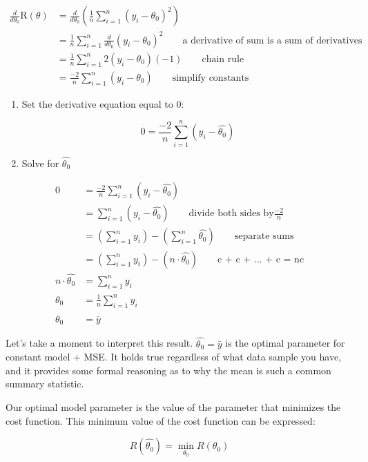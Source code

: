 \documentclass[
  letterpaper,
  DIV=11,
  numbers=noendperiod]{scrreprt}
\begin{document}
\[
\begin{align}
\frac{d}{d\theta_0}\text{R}(\theta) & = \frac{d}{d\theta_0}(\frac{1}{n}\sum^{n}_{i=1} (y_i - \theta_0)^2)
\\ &= \frac{1}{n}\sum^{n}_{i=1} \frac{d}{d\theta_0}  (y_i - \theta_0)^2 \quad \quad \text{a derivative of sum is a sum of derivatives}
\\ &= \frac{1}{n}\sum^{n}_{i=1} 2 (y_i - \theta_0) (-1) \quad \quad \text{chain rule}
\\ &= {\frac{-2}{n}}\sum^{n}_{i=1} (y_i - \theta_0) \quad \quad \text{simplify constants}
\end{align}
\]

\begin{enumerate}
\def\labelenumi{\arabic{enumi}.}
\setcounter{enumi}{1}
\item
  Set the derivative equation equal to 0:

  \[
  0 = {\frac{-2}{n}}\sum^{n}_{i=1} (y_i - \hat{\theta_0})
  \]
\item
  Solve for \(\hat{\theta_0}\)
\end{enumerate}

\[
\begin{align}
0 &= {\frac{-2}{n}}\sum^{n}_{i=1} (y_i - \hat{\theta_0})
\\ &= \sum^{n}_{i=1} (y_i - \hat{\theta_0}) \quad \quad \text{divide both sides by} \frac{-2}{n}
\\ &= \left(\sum^{n}_{i=1} y_i\right) - \left(\sum^{n}_{i=1} \hat{\theta_0}\right) \quad \quad \text{separate sums}
\\ &= \left(\sum^{n}_{i=1} y_i\right) - (n \cdot \hat{\theta_0}) \quad \quad  \text{c + c + … + c = nc}
\\ n \cdot \hat{\theta_0} &= \sum^{n}_{i=1} y_i
\\ \hat{\theta_0} &= \frac{1}{n} \sum^{n}_{i=1} y_i
\\ \hat{\theta_0} &= \bar{y}
\end{align}
\]

Let's take a moment to interpret this result.
\(\hat{\theta_0} = \bar{y}\) is the optimal parameter for constant model
+ MSE. It holds true regardless of what data sample you have, and it
provides some formal reasoning as to why the mean is such a common
summary statistic.

Our optimal model parameter is the value of the parameter that minimizes
the cost function. This minimum value of the cost function can be
expressed:

\[R(\hat{\theta_0}) = \min_{\theta_0} R(\theta_0)\]
\end{document}
